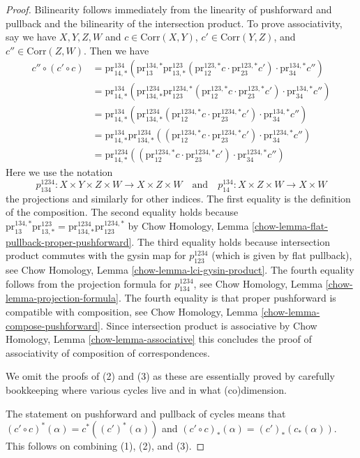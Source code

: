 \begin{proof}
Bilinearity follows immediately from the linearity of pushforward
and pullback and the bilinearity of the intersection product.
To prove associativity, say we have
$X, Y, Z, W$ and $c \in \text{Corr}(X, Y)$, $c' \in \text{Corr}(Y, Z)$, and
$c'' \in \text{Corr}(Z, W)$. Then we have
\begin{align*}
c'' \circ (c' \circ c)
& =
\text{pr}^{134}_{14, *}(
\text{pr}^{134, *}_{13}
\text{pr}^{123}_{13, *}(\text{pr}^{123, *}_{12}c \cdot
\text{pr}^{123, *}_{23}c')
\cdot \text{pr}^{134, *}_{34}c'') \\
& =
\text{pr}^{134}_{14, *}(
\text{pr}^{1234}_{134, *}
\text{pr}^{1234, *}_{123}(\text{pr}^{123, *}_{12}c \cdot
\text{pr}^{123, *}_{23}c')
\cdot \text{pr}^{134, *}_{34}c'') \\
& =
\text{pr}^{134}_{14, *}(
\text{pr}^{1234}_{134, *}
(\text{pr}^{1234, *}_{12}c \cdot
\text{pr}^{1234, *}_{23}c')
\cdot \text{pr}^{134, *}_{34}c'') \\
& =
\text{pr}^{134}_{14, *}
\text{pr}^{1234}_{134, *}
((\text{pr}^{1234, *}_{12}c \cdot
\text{pr}^{1234, *}_{23}c')
\cdot \text{pr}^{1234, *}_{34}c'') \\
& =
\text{pr}^{1234}_{14, *}(
(\text{pr}^{1234, *}_{12}c \cdot
\text{pr}^{1234, *}_{23}c') \cdot
\text{pr}^{1234, *}_{34}c'')
\end{align*}
Here we use the notation
$$
p^{1234}_{134} : X \times Y \times Z \times W \to X \times Z \times W
\quad\text{and}\quad
p^{134}_{14} : X \times Z \times W \to X \times W
$$
the projections and similarly for other indices.
The first equality is the definition of the composition.
The second equality holds because
$\text{pr}^{134, *}_{13} \text{pr}^{123}_{13, *} =
\text{pr}^{1234}_{134, *} \text{pr}^{1234, *}_{123}$
by Chow Homology, Lemma \ref{chow-lemma-flat-pullback-proper-pushforward}.
The third equality holds because intersection product commutes
with the gysin map for $p^{1234}_{123}$ (which is given by flat pullback), see
Chow Homology, Lemma \ref{chow-lemma-lci-gysin-product}.
The fourth equality follows from the projection formula for
$p^{1234}_{134}$, see Chow Homology, Lemma \ref{chow-lemma-projection-formula}.
The fourth equality is that proper pushforward is compatible
with composition, see Chow Homology, Lemma \ref{chow-lemma-compose-pushforward}.
Since intersection product is associative by
Chow Homology, Lemma \ref{chow-lemma-associative}
this concludes the proof of associativity of composition of correspondences.

\medskip\noindent
We omit the proofs of (2) and (3) as these are essentially proved by
carefully bookkeeping where various cycles live and in what (co)dimension.

\medskip\noindent
The statement on pushforward and pullback of cycles
means that $(c' \circ c)^*(\alpha) = c^*((c')^*(\alpha))$ and
$(c' \circ c)_*(\alpha) = (c')_*(c_*(\alpha))$.
This follows on combining (1), (2), and (3).
\end{proof}

